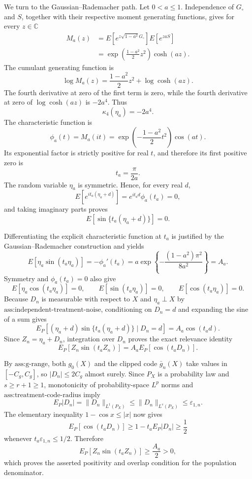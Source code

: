 We turn to the Gaussian--Rademacher path.  Let \(0<a\leq1\).  Independence of \(G_{\circ}\) and \(S\), together with their respective moment generating functions, gives for every \(z\in\mathbb C\)
\[
\begin{aligned}
 M_a(z)
 &=E\!\left[e^{z\sqrt{1-a^2}G_{\circ}}\right]
   E\!\left[e^{zaS}\right]\\
 &=\exp\!\left(\frac{1-a^2}{2}z^2\right)\cosh(az).
\end{aligned}
\]
The cumulant generating function is
\[
 \log M_a(z)=\frac{1-a^2}{2}z^2+\log\cosh(az).
\]
The fourth derivative at zero of the first term is zero, while the fourth derivative at zero of \(\log\cosh(az)\) is \(-2a^4\).  Thus
\[
 \kappa_4(\eta_a)=-2a^4.
\]
The characteristic function is
\[
 \phi_a(t)=M_a(it)
 =\exp\!\left(-\frac{1-a^2}{2}t^2\right)\cos(at).
\]
Its exponential factor is strictly positive for real \(t\), and therefore its first positive zero is
\[
 t_a=\frac{\pi}{2a}.
\]
The random variable \(\eta_a\) is symmetric.  Hence, for every real \(d\),
\[
 E\!\left[e^{it_a(\eta_a+d)}\right]
 =e^{it_ad}\phi_a(t_a)=0,
\]
and taking imaginary parts proves
\[
 E\!\left[\sin\{t_a(\eta_a+d)\}\right]=0.
\]

Differentiating the explicit characteristic function at \(t_a\) is justified by the Gaussian--Rademacher construction and yields
\[
 E[\eta_a\sin(t_a\eta_a)]
 =-\phi_a'(t_a)
 =a\exp\!\left\{-\frac{(1-a^2)\pi^2}{8a^2}\right\}
 =A_a.
\]
Symmetry and \(\phi_a(t_a)=0\) also give
\[
 E[\eta_a\cos(t_a\eta_a)]=0,
 \qquad E[\sin(t_a\eta_a)]=0,
 \qquad E[\cos(t_a\eta_a)]=0.
\]
Because \(D_n\) is measurable with respect to \(X\) and \(\eta_a\perp X\) by \(\text{ass:independent-treatment-noise}\), conditioning on \(D_n=d\) and expanding the sine of a sum gives
\[
 E_P\!\left[(\eta_a+d)\sin\{t_a(\eta_a+d)\}\mid D_n=d\right]
 =A_a\cos(t_ad).
\]
Since \(Z_n=\eta_a+D_n\), integration over \(D_n\) proves the exact relevance identity
\[
 E_P[Z_n\sin(t_aZ_n)]
 =A_aE_P[\cos(t_aD_n)].
\]

By \(\text{ass:g-range}\), both \(g_0(X)\) and the clipped code \(\bar g_n(X)\) take values in \([-C_g,C_g]\), so \(\lvert D_n\rvert\leq2C_g\) almost surely.  Since \(P_X\) is a probability law and \(s\geq r+1\geq1\), monotonicity of probability-space \(L^p\) norms and \(\text{ass:treatment-code-radius}\) imply
\[
 E_P\lvert D_n\rvert
 =\lVert D_n\rVert_{L^1(P_X)}
 \leq\lVert D_n\rVert_{L^s(P_X)}
 \leq\varepsilon_{1,n}.
\]
The elementary inequality \(1-\cos x\leq\lvert x\rvert\) now gives
\[
 E_P[\cos(t_aD_n)]
 \geq1-t_aE_P\lvert D_n\rvert
 \geq\frac12
\]
whenever \(t_a\varepsilon_{1,n}\leq1/2\).  Therefore
\[
 E_P[Z_n\sin(t_aZ_n)]\geq\frac{A_a}{2}>0,
\]
which proves the asserted positivity and overlap condition for the population denominator.

